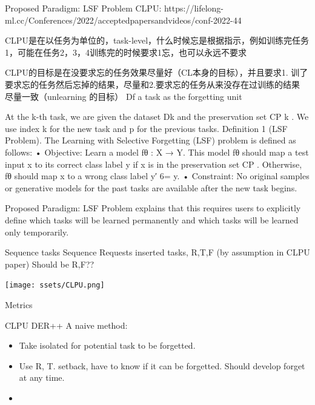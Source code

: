 \documentclass[
  ignorenonframetext,
  aspectratio=169,
]{beamer}
\providecommand{\tightlist}{%
  \setlength{\itemsep}{0pt}\setlength{\parskip}{0pt}}\usepackage{longtable,booktabs,array}
\begin{document}
\begin{frame}{Proposed Paradigm: LSF Problem}
\label{proposed-paradigm-lsf-problem}
CLPU:
https://lifelong-ml.cc/Conferences/2022/acceptedpapersandvideos/conf-2022-44

CLPU是在以任务为单位的，task-level，什么时候忘是根据指示，例如训练完任务1，可能在任务2，3，4训练完的时候要求1忘，也可以永远不要求

CLPU的目标是在没要求忘的任务效果尽量好（CL本身的目标），并且要求1.
训了要求忘的任务然后忘掉的结果，尽量和2.要求忘的任务从来没存在过训练的结果
尽量一致（unlearning 的目标） Df a task as the forgetting unit

At the k-th task, we are given the dataset Dk and the preservation set
CP k . We use index k for the new task and p for the previous tasks.
Definition 1 (LSF Problem). The Learning with Selective Forgetting (LSF)
problem is defined as follows: • Objective: Learn a model fθ : X → Y.
This model fθ should map a test input x to its correct class label y if
x is in the preservation set CP . Otherwise, fθ should map x to a wrong
class label y′ 6= y. • Constraint: No original samples or generative
models for the past tasks are available after the new task begins.
\end{frame}

\begin{frame}{Proposed Paradigm: LSF Problem}
\label{proposed-paradigm-lsf-problem-1}
explains that this requires users to explicitly define which tasks will
be learned permanently and which tasks will be learned only temporarily.

Sequence tasks Sequence Requests inserted tasks, R,T,F (by assumption in
CLPU paper) Should be R,F??
\end{frame}

\begin{frame}{}
\label{section}
\texttt{[image: ssets/CLPU.png]}
\end{frame}

\begin{frame}{Metrics}
\label{metrics}
\end{frame}

\begin{frame}{CLPU DER++}
\label{clpu-der}
A naive method:

\begin{itemize}
\tightlist
\item
  Take isolated for potential task to be forgetted.
\item
  Use R, T. setback, have to know if it can be forgetted. Should develop
  forget at any time.
\item
\end{itemize}
\end{frame}
\end{document}
